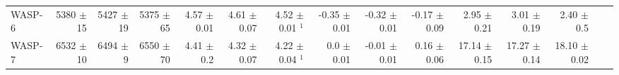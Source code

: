 \begin{sidewaystable*}[t!]
{\begin{tabular}{l r r r r r r r r r r r r r r}
WASP-6  
& 5380  $\pm$ 15
& 5427  $\pm$ 19
& 5375 $\pm$ 65
&  4.57  $\pm$ 0.01  
&  4.61  $\pm$ 0.07  
&  4.52  $\pm$ 0.01 $^1$
&  -0.35  $\pm$ 0.01 
& -0.32  $\pm$ 0.01
&  -0.17  $\pm$ 0.09
&  2.95  $\pm$ 0.21
& 3.01   $\pm$ 0.19
&  2.40  $\pm$ 0.5 \\


WASP-7  
&  6532  $\pm$ 10
& 6494  $\pm$ 9
&  6550 $\pm$ 70
&  4.41  $\pm$ 0.2
&  4.32  $\pm$ 0.07
&  4.22  $\pm$ 0.04 $^1$
&  0.0  $\pm$ 0.01
& -0.01  $\pm$ 0.01
&  0.16  $\pm$ 0.06
& 17.14  $\pm$ 0.15
& 17.27  $\pm$ 0.14
&  18.10   $\pm$ 0.02 \\


\end{tabular}}
\end{sidewaystable*}
